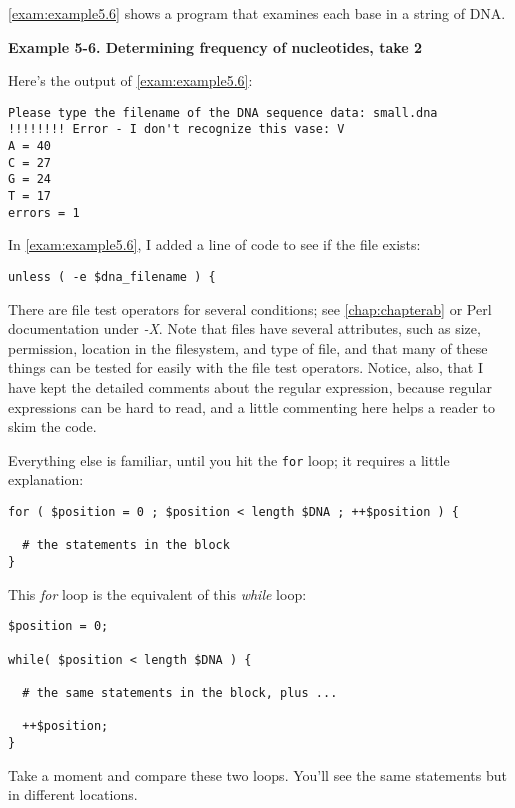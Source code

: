 \autoref{exam:example5.6} shows a program that examines each base in a string of DNA. 

\textbf{Example 5-6. Determining frequency of nucleotides, take 2}


Here's the output of \autoref{exam:example5.6}:

\begin{lstlisting}
Please type the filename of the DNA sequence data: small.dna
!!!!!!!! Error - I don't recognize this vase: V
A = 40
C = 27
G = 24
T = 17
errors = 1
\end{lstlisting}

In \autoref{exam:example5.6}, I added a line of code to see if the file exists:

\begin{lstlisting}
unless ( -e $dna_filename ) {
\end{lstlisting}

There are file test operators for several conditions; see \autoref{chap:chapterab} or Perl documentation under \textit{-X}. Note that files have several attributes, such as size, permission, location in the filesystem, and type of file, and that many of these things can be tested for easily with the file test operators.  
Notice, also, that I have kept the detailed comments about the regular expression, because regular expressions can be hard to read, and a little commenting here helps a reader to skim the code.

Everything else is familiar, until you hit the \verb|for| loop; it requires a little explanation: 

\begin{lstlisting}
for ( $position = 0 ; $position < length $DNA ; ++$position ) {
  
  # the statements in the block
}
\end{lstlisting}

This \textit{for} loop is the equivalent of this \textit{while} loop: 

\begin{lstlisting}
$position = 0;

while( $position < length $DNA ) {

  # the same statements in the block, plus ...

  ++$position;
}
\end{lstlisting}

Take a moment and compare these two loops. You'll see the same statements but in different locations.

